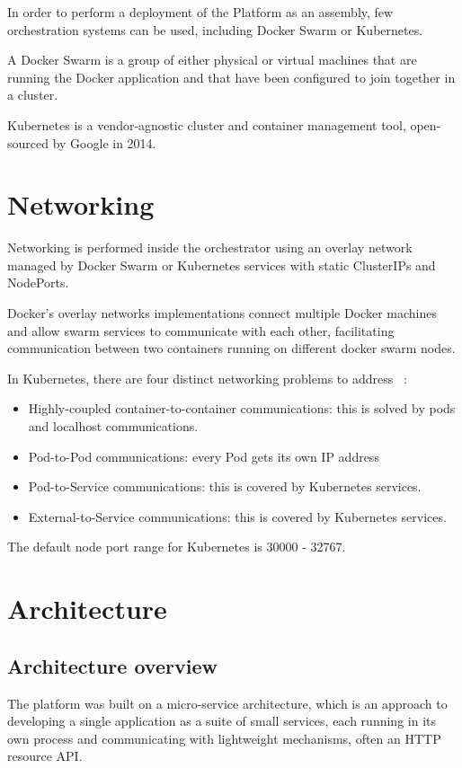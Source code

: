 In order to perform a deployment of the Platform as an assembly, few orchestration systems can be used, including Docker Swarm or Kubernetes.

A Docker Swarm is a group of either physical or virtual machines that are running the Docker application and that have been configured to join together in a cluster.

Kubernetes is a vendor-agnostic cluster and container management tool, open-sourced by Google in 2014.

\section{Networking}

Networking is performed inside the orchestrator using an overlay network managed by Docker Swarm or Kubernetes services with static ClusterIPs and NodePorts.

Docker's overlay networks implementations connect multiple Docker machines and allow swarm services to communicate with each other, facilitating communication between two containers running on
different docker swarm nodes.

In Kubernetes, there are four distinct networking problems to address ~\cite{authors2017kubernetes}:

\begin{itemize}
    \item Highly-coupled container-to-container communications: this is solved by pods and localhost communications.
    \item Pod-to-Pod communications: every Pod gets its own IP address
    \item Pod-to-Service communications: this is covered by Kubernetes services.
    \item External-to-Service communications: this is covered by Kubernetes services.
\end{itemize}

The default node port range for Kubernetes is 30000 - 32767.


\section{Architecture}

\subsection{Architecture overview}
The platform was built on a micro-service architecture, which is an approach to developing a single application as a suite of small services, each running in its own process and communicating with lightweight mechanisms, often an HTTP resource API.

